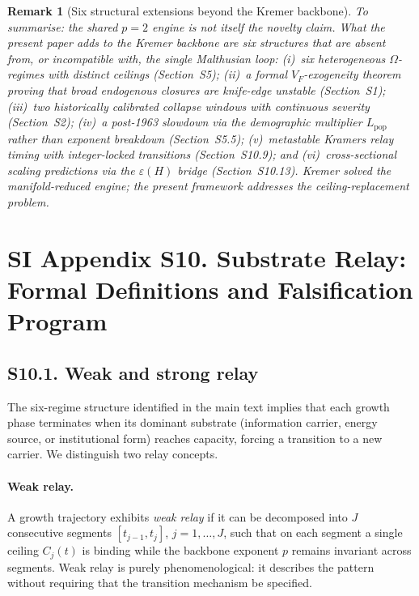 \documentclass[11pt]{article}
\newtheorem{remark}{Remark}
\begin{document}
\begin{remark}[Six structural extensions beyond the Kremer backbone]
\label{rem:kremer_extensions}
To summarise: the shared $p=2$ engine is not itself the novelty claim.
What the present paper adds to the Kremer backbone are six structures
that are absent from, or incompatible with, the single Malthusian loop:
(i)~six heterogeneous $\Omega$-regimes with distinct ceilings
(Section~S5);
(ii)~a formal $V_F$-exogeneity theorem proving that broad endogenous
closures are knife-edge unstable (Section~S1);
(iii)~two historically calibrated collapse windows with
continuous severity (Section~S2);
(iv)~a post-1963 slowdown via the demographic multiplier
$L_{\mathrm{pop}}$ rather than exponent breakdown (Section~S5.5);
(v)~metastable Kramers relay timing with integer-locked
transitions (Section~S10.9);
and (vi)~cross-sectional scaling predictions via the
$\varepsilon(H)$ bridge (Section~S10.13).
Kremer solved the manifold-reduced engine;
the present framework addresses the ceiling-replacement problem.
\end{remark}

\pagebreak

\section*{SI Appendix S10. Substrate Relay: Formal Definitions and Falsification Program}
\label{sec:S10_relay}


\subsection*{S10.1. Weak and strong relay}

The six-regime structure identified in the main text implies that each growth
phase terminates when its dominant substrate (information carrier, energy source,
or institutional form) reaches capacity, forcing a transition to a new carrier.
We distinguish two relay concepts.

\paragraph{Weak relay.}
A growth trajectory exhibits \emph{weak relay} if it can be decomposed into
$J$ consecutive segments $[t_{j-1},t_j]$, $j=1,\dots,J$, such that on each
segment a single ceiling $C_j(t)$ is binding while the backbone exponent $p$
remains invariant across segments. Weak relay is purely phenomenological:
it describes the pattern without requiring that the transition mechanism be
specified.
\end{document}
